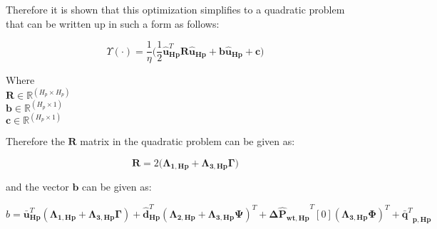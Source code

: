 Therefore it is shown that this optimization simplifies to a quadratic problem that can be written up in such a form as follows:

\begin{equation}
  \Upsilon(\cdot) = \frac{1}{\eta}\Big( \frac{1}{2} \bm{\hat{u}}_{\bm{Hp}}^{T} \bm{R} \bm{\hat{u}}_{\bm{Hp}} + \bm{b} \bm{\hat{u}}_{\bm{Hp}} + \bm{c} \Big)
\end{equation}

\begin{minipage}[t]{0.28\textwidth}
Where\\
\hspace*{8mm} $\bm{R} \in \pmb{\mathbb{R}}^{(H_p \times H_p)} $ \\
\hspace*{8mm} $\bm{b} \in \pmb{\mathbb{R}}^{(H_p \times 1)} $ \\
\hspace*{8mm} $\bm{c} \in \pmb{\mathbb{R}}^{(H_p \times 1)} $
\end{minipage}

Therefore the $\bm{R}$ matrix in the quadratic problem can be given as:

\begin{equation}
  \bm{R} = 2\Big(\bm{\Lambda}_{\bm{1,Hp}} + \bm{\Lambda}_{\bm{3,Hp}} \bm{\Gamma}\Big) 
\end{equation}

and the vector $\bm{b}$ can be given as:

\begin{equation}
\!\! b = \bm{\bar{u}}_{\bm{Hp}}^{T}(\bm{\Lambda}_{\bm{1,Hp}} \!+ \!\bm{\Lambda}_{\bm{3,Hp}} \bm{\Gamma} )\! + \!\bm{\hat{d}}_{\bm{Hp}}^{T}(\bm{\Lambda}_{\bm{2,Hp}}\! + \!\bm{\Lambda}_{\bm{3,Hp}} \bm{\Psi} )^{T}
  + \bm{\Delta \hat{P}_{\bm{wt,Hp}}}^{T}[0] (\bm{\Lambda}_{\bm{3,Hp}} \bm{\Phi})^{T} + {\bm{\bar{q}}^{T}}_{\bm{p,Hp}}
\end{equation}